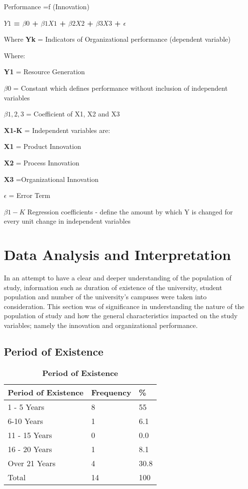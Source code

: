 Performance =ƒ (Innovation) 

\textbf{$Y1$ = $\beta0$ + $\beta1X1$ + $\beta2X2$ + $\beta3X3$ + $\epsilon$}

Where \textbf{Yk} = Indicators of Organizational performance (dependent variable) 

Where: 

\textbf{Y1} = Resource Generation 

\textbf{$\beta0$ }= Constant which defines performance without inclusion of independent variables

\textbf{$\beta1, 2, 3$ }= Coefficient of X1, X2 and X3 

\textbf{X1-K} = Independent variables are:

\textbf{X1} = Product Innovation 

\textbf{X2} = Process Innovation 

\textbf{X3} =Organizational Innovation 

\textbf{$\epsilon$ }= Error Term 

\textbf{$\beta1 -K$} Regression coefficients - define the amount by which Y is changed for every unit change in independent variables

\section{\textbf{Data Analysis and Interpretation}}
In an attempt to have a clear and deeper understanding of the population of study, information such as duration of existence of the university, student population and number of the university’s campuses were taken into consideration. This section was of significance in understanding the nature of the population of study and how the general characteristics impacted on the study variables; namely the innovation and organizational performance.

\subsection{\textbf{Period of Existence}}

\begin{table}[ht]
    \centering
\begin{tabular}{|l|l|l|}
\hline
   \textbf{Period of Existence} & \textbf{Frequency} & \textbf{\%}\\ \hline
   1 - 5 Years	& 8 & 55\\ \hline  
   6-10 Years & 1 & 6.1\\ \hline  
   11 - 15 Years &	0 & 0.0\\ \hline  
   16 - 20 Years & 1 & 8.1\\ \hline  
   Over 21 Years & 4 & 30.8\\ \hline  
   Total & 14 & 100\\ \hline  
\end{tabular}
    \caption{\textbf{Period of Existence}}
\end{table}

